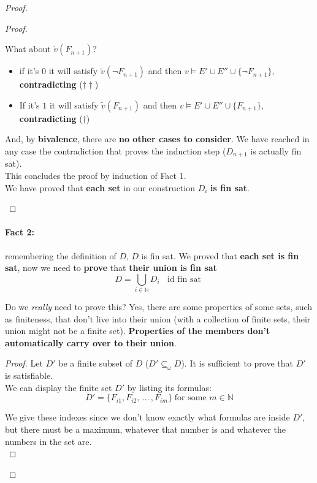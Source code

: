 \documentclass[11pt]{article}
\begin{document}
\begin{proof}
\begin{proof}
\begin{itemize}
				What about $\tilde{v}(F_{n+1})$?
				\begin{itemize}
					\item if it's $0$ it will satisfy $\tilde{v} (\neg F_{n+1})$ and then $v \models E' \cup E'' \cup \{\neg F_{n+1}\}$, \textbf{contradicting} ($\dag \dag$)
					\item If it's $1$ it will satisfy $\tilde{v} (F_{n+1})$ and then $v \models E' \cup E'' \cup \{F_{n+1}\}$, \textbf{contradicting} ($\dag$)
				\end{itemize}
				And, by \textbf{bivalence}, there are \textbf{no other cases to consider}. We have reached in any case the contradiction that proves the induction step ($D_{n+1}$ is actually fin sat).\\
				This concludes the proof by induction of Fact 1.\\
				
				We have proved that \textbf{each set} in our construction $D_i$ \textbf{is fin sat}.\\
			\end{itemize}
		\end{proof}
		
		\newpage
		
		\paragraph{Fact 2:} remembering the definition of $D$, $D$ is fin sat. We proved that \textbf{each set is fin sat}, now we need to \textbf{prove} that \textbf{their union is fin sat}
		$$ D = \bigcup_{i \in \mathbb{N}} D_i \;\; \text{ id fin sat } $$
		
		Do we \textit{really} need to prove this? Yes, there are some properties of some sets, such as finiteness, that don't live into their union (with a collection of finite sets, their union might not be a finite set). \textbf{Properties of the members don't automatically carry over to their union}.\\
		
		\begin{proof}
			Let $D'$ be a finite subset of $D$ ($D' \subseteq_\omega D$). It is sufficient to prove that $D'$ is satisfiable.\\
			
			We can display the finite set $D'$ by listing its formulas: 
			$$ D' = \{F_{i1}, F_{i2}, \, ... \, , F_{im}\} \; \text{for some } m \in \mathbb{N} $$
			
			We give these indexes since we don't know exactly what formulas are inside $D'$, but there must be a maximum, whatever that number is and whatever the numbers in the set are.\\
			

\end{proof}
\end{proof}
\end{document}
